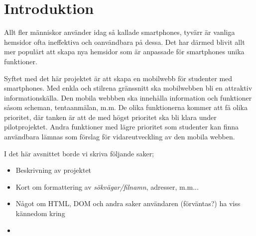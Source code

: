 \section{Introduktion}
Allt fler människor använder idag så kallade smartphones, tyvärr är vanliga
hemsidor ofta ineffektiva och oanvändbara på dessa. Det har därmed blivit allt
mer populärt att skapa nya hemsidor som är anpassade för smartphones unika
funktioner.

Syftet med det här projektet är att skapa en mobilwebb för studenter med
smartphones. Med enkla och stilrena gränssnitt ska mobilwebben bli en attraktiv
informationskälla. Den mobila webbben ska innehålla information och funktioner
såsom scheman, tentaanmälan, m.m. De olika funktionerna kommer att få olika
prioritet, där tanken är att de med högst prioritet ska bli klara under
pilotprojektet. Andra funktioner med lägre prioritet som studenter kan
finna användbara lämnas som förslag för vidareutveckling av den mobila webben.

I det här avsnittet borde vi skriva följande saker;
\begin{itemize}
  \item Beskrivning av projektet
  \item Kort om formattering av {\it sökvägar/filnamn}, adresser, m.m...
  \item Något om HTML, DOM och andra saker användaren (förväntas?) ha viss
    kännedom kring
  \item 
\end{itemize}
